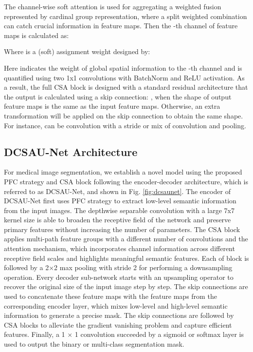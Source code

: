 \documentclass[a4paper,fleqn]{cas-dc}
\begin{document}
The channel-wise soft attention is used for aggregating a weighted fusion represented by cardinal group representation, where a split weighted combination can catch crucial information in feature maps. Then the -th channel of feature maps is calculated as:

Where  is a (soft) assignment weight designed by:

Here  indicates the weight of global spatial information  to the -th channel and is quantified using two 1x1 convolutions with BatchNorm and ReLU activation. As a result, the full CSA block is designed with a standard residual architecture that the output  is calculated using a skip connection: , when the shape of output feature maps is the same as the input feature maps. Otherwise, an extra transformation  will be applied on the skip connection to obtain the same shape. For instance,  can be convolution with a stride or mix of convolution and pooling.



\subsection{DCSAU-Net Architecture}
\label{ssec:subhead}

For medical image segmentation, we establish a novel model using the proposed PFC strategy and CSA block following the encoder-decoder architecture, which is referred to as DCSAU-Net, and shown in Fig. \ref{fig:dcsaunet}. 
The encoder of DCSAU-Net first uses PFC strategy to extract low-level semantic information from the input images. The depthwise separable convolution with a large 7x7 kernel size is able to broaden the receptive field of the network and preserve primary features without increasing the number of parameters. The CSA block applies multi-path feature groups with a different number of convolutions and the attention mechanism, which incorporates channel information across different receptive field scales and highlights meaningful semantic features. Each of block is followed by a 2×2 max pooling with stride 2 for performing a downsampling operation. Every decoder sub-network starts with an upsampling operator to recover the original size of the input image step by step. The skip connections are used to concatenate these feature maps with the feature maps from the corresponding encoder layer, which mixes low-level and high-level semantic information to generate a precise mask. The skip connections are
followed by CSA blocks to alleviate the gradient vanishing problem and capture efficient features. Finally, a 1 × 1 convolution succeeded by a sigmoid or softmax layer is used to output the binary or multi-class segmentation mask. 
\end{document}
